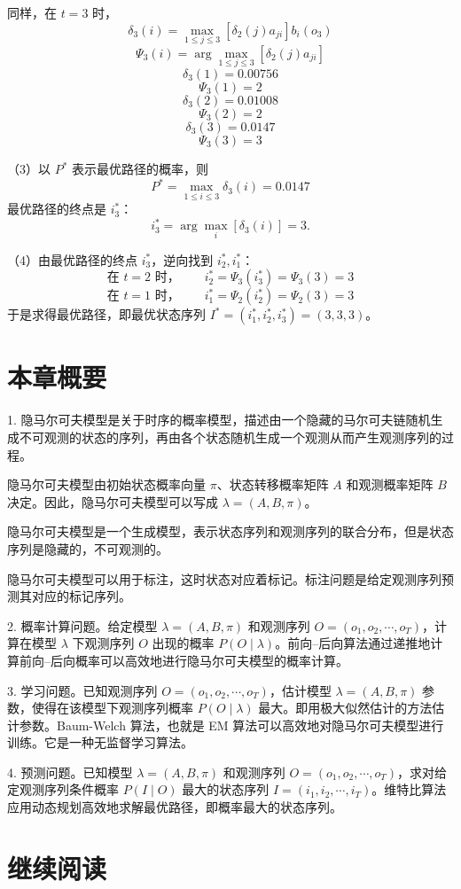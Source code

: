 \documentclass[UTF8, 12pt, fontset=fandol, oneside]{ctexart}
\begin{document}
同样，在 $t=3$ 时，
\[
  \delta_3(i)=\max_{1\le j\le3}[\delta_2(j)a_{ji}]b_i(o_3)
\]
\[
  \Psi_3(i)=\arg\max_{1\le j\le3}[\delta_2(j)a_{ji}]
\]
\[
  \delta_3(1)=0.00756
\]
\[
  \Psi_3(1)=2
\]
\[
  \delta_3(2)=0.01008
\]
\[
  \Psi_3(2)=2
\]
\[
  \delta_3(3)=0.0147
\]
\[
  \Psi_3(3)=3
\]

（3）以 $P^*$ 表示最优路径的概率，则
\[
  P^*=\max_{1\le i\le3}\delta_3(i)=0.0147
\]
最优路径的终点是 $i_3^*$：
\[
  i_3^*=\arg\max_i[\delta_3(i)]=3.
\]

（4）由最优路径的终点 $i_3^*$，逆向找到 $i_2^*,i_1^*$：
\[
  \text{在 }t=2\text{ 时，}\qquad i_2^*=\Psi_3(i_3^*)=\Psi_3(3)=3
\]
\[
  \text{在 }t=1\text{ 时，}\qquad i_1^*=\Psi_2(i_2^*)=\Psi_2(3)=3
\]
于是求得最优路径，即最优状态序列 $I^*=(i_1^*,i_2^*,i_3^*)=(3,3,3)$。

\section*{本章概要}

1. 隐马尔可夫模型是关于时序的概率模型，描述由一个隐藏的马尔可夫链随机生成不可观测的状态的序列，再由各个状态随机生成一个观测从而产生观测序列的过程。

隐马尔可夫模型由初始状态概率向量 $\pi$、状态转移概率矩阵 $A$ 和观测概率矩阵 $B$ 决定。因此，隐马尔可夫模型可以写成 $\lambda=(A,B,\pi)$。

隐马尔可夫模型是一个生成模型，表示状态序列和观测序列的联合分布，但是状态序列是隐藏的，不可观测的。

隐马尔可夫模型可以用于标注，这时状态对应着标记。标注问题是给定观测序列预测其对应的标记序列。

2. 概率计算问题。给定模型 $\lambda=(A,B,\pi)$ 和观测序列 $O=(o_1,o_2,\cdots,o_T)$，计算在模型 $\lambda$ 下观测序列 $O$ 出现的概率 $P(O\mid\lambda)$。前向--后向算法通过递推地计算前向--后向概率可以高效地进行隐马尔可夫模型的概率计算。

3. 学习问题。已知观测序列 $O=(o_1,o_2,\cdots,o_T)$，估计模型 $\lambda=(A,B,\pi)$ 参数，使得在该模型下观测序列概率 $P(O\mid\lambda)$ 最大。即用极大似然估计的方法估计参数。Baum-Welch 算法，也就是 EM 算法可以高效地对隐马尔可夫模型进行训练。它是一种无监督学习算法。

4. 预测问题。已知模型 $\lambda=(A,B,\pi)$ 和观测序列 $O=(o_1,o_2,\cdots,o_T)$，求对给定观测序列条件概率 $P(I\mid O)$ 最大的状态序列 $I=(i_1,i_2,\cdots,i_T)$。维特比算法应用动态规划高效地求解最优路径，即概率最大的状态序列。

\section*{继续阅读}
\end{document}
